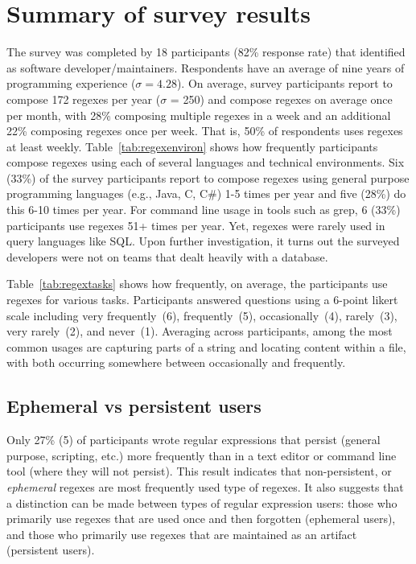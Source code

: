 \section{Summary of survey results}

The survey was completed by 18 participants (82\% response rate) that identified as software developer/maintainers.
Respondents have an average of nine years of programming experience ($\sigma = 4.28$).
On average, survey participants report to compose 172 regexes per year ($\sigma$ = 250) and compose regexes on average once per month, with 28\% composing multiple regexes in a week and an additional 22\% composing regexes once per week. That is, 50\% of respondents uses regexes at least weekly.
Table~\ref{tab:regexenviron} shows how frequently participants compose regexes using each of several languages and technical environments.
Six (33\%) of the survey participants report to compose regexes using general purpose programming languages (e.g., Java, C, C\#) 1-5 times per year and five (28\%) do this 6-10 times per year.  For command line usage in tools such as grep, 6 (33\%) participants use regexes 51+ times per year. Yet, regexes were rarely used in query languages like SQL. Upon further investigation, it turns out the surveyed developers were not on teams that dealt heavily with a database.





Table~\ref{tab:regextasks} shows how frequently, on average, the participants use
regexes for various tasks.
Participants answered questions using a 6-point likert scale including very frequently~(6), frequently~(5), occasionally~(4), rarely~(3), very rarely~(2), and never~(1).
Averaging across participants, among the most common usages are capturing parts of a string and locating content within a file, with both occurring somewhere between occasionally and frequently.


\subsection{Ephemeral vs persistent users}
Only 27\% (5)
of participants wrote regular expressions that persist (general purpose, scripting, etc.) more frequently than in a text editor or command line tool (where they will not persist).  This result indicates that non-persistent, or \emph{ephemeral} regexes are most frequently used type of regexes.  It also suggests that a distinction can be made between types of regular expression users: those who primarily use regexes that are used once and then forgotten (ephemeral users), and those who primarily use regexes that are maintained as an artifact (persistent users).

